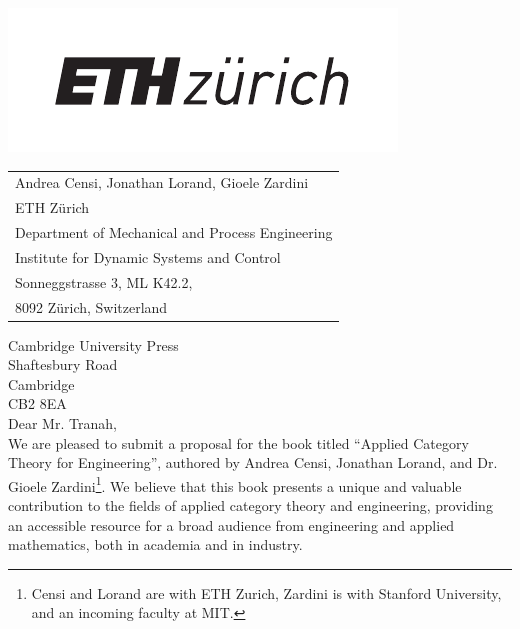 \documentclass[10pt, article, one side]{memoir}
\begin{document}
    \begin{minipage}{0.45\linewidth}
        \includegraphics[width=0.9\linewidth]{pics/ethlogo.pdf}
        \vfill
    \end{minipage}
    \begin{minipage}{0.5\linewidth}
        \begin{flushright}
            \begin{tabular}{l}
                Andrea Censi, Jonathan Lorand, Gioele Zardini \\
                ETH Z\"urich \\
                Department of Mechanical and Process Engineering \\
                Institute for Dynamic Systems and Control \\
                Sonneggstrasse 3, ML K42.2, \\
                8092 Z\"urich, Switzerland
            \end{tabular}
        \end{flushright}
    \end{minipage}

    \vspace{1cm}

    \noindent Cambridge University Press\\
    \noindent Shaftesbury Road\\
    \noindent Cambridge\\
    \noindent CB2 8EA\\[+7pt]

    Dear Mr.
    Tranah,\\[-5pt]

    We are pleased to submit a proposal for the book titled ``Applied Category Theory for Engineering'', authored by 
    Andrea Censi, 
    Jonathan Lorand, and Dr.
    Gioele Zardini\footnote{Censi and Lorand are with ETH Zurich, Zardini is with Stanford University, and an incoming faculty at MIT.
    }{}.
    We believe that this book presents a unique and valuable contribution to the fields of applied category theory and engineering, providing an accessible resource for a broad audience from engineering and applied mathematics, both in academia and in industry.
    \\[-7pt]
\end{document}
